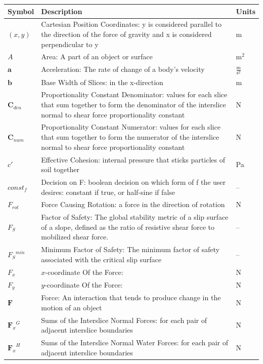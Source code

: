 \documentclass[12pt]{article}
\begin{document}
\begin{longtabu}{l X[l] l}
\toprule
\textbf{Symbol} & \textbf{Description} & \textbf{Units}
\\
\midrule
\endhead
$(x,y)$ & Cartesian Position Coordinates: y is considered parallel to the direction of the force of gravity and x is considered perpendicular to y & m
\\
$A$ & Area: A part of an object or surface & $\text{m}^{2}$
\\
$\mathbf{a}$ & Acceleration: The rate of change of a body's velocity & $\frac{\text{m}}{\text{s}^{2}}$
\\
$\mathbf{b}$ & Base Width of Slices: in the x-direction & m
\\
${\mathbf{C}_{den}}$ & Proportionality Constant Denominator: values for each slice that sum together to form the denominator of the interslice normal to shear force proportionality constant & N
\\
${\mathbf{C}_{num}}$ & Proportionality Constant Numerator: values for each slice that sum together to form the numerator of the interslice normal to shear force proportionality constant & N
\\
$c'$ & Effective Cohesion: internal pressure that sticks particles of soil together & Pa
\\
$const_f$ & Decision on F: boolean decision on which form of f the user desires: constant if true, or half-sine if false & --
\\
${F_{rot}}$ & Force Causing Rotation: a force in the direction of rotation & N
\\
${F_{S}}$ & Factor of Safety: The global stability metric of a slip surface of a slope, defined as the ratio of resistive shear force to mobilized shear force. & --
\\
${{F_{S}}^{min}}$ & Minimum Factor of Safety: The minimum factor of safety associated with the critical slip surface & --
\\
${F_{x}}$ & $x$-coordinate Of the Force:  & N
\\
${F_{y}}$ & $y$-coordinate Of the Force:  & N
\\
$\mathbf{F}$ & Force: An interaction that tends to produce change in the motion of an object & N
\\
${{\mathbf{F}_{x}}^{G}}$ & Sums of the Interslice Normal Forces: for each pair of adjacent interslice boundaries & N
\\
${{\mathbf{F}_{x}}^{H}}$ & Sums of the Interslice Normal Water Forces: for each pair of adjacent interslice boundaries & N

\end{longtabu}
\end{document}
